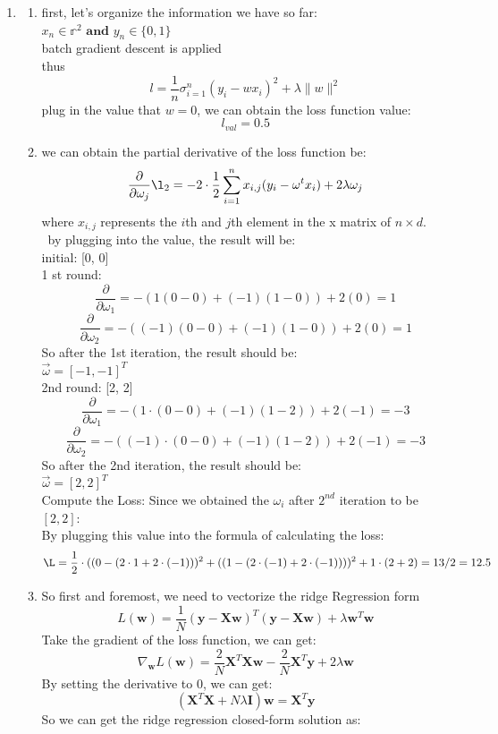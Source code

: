 \documentclass[12pt]{article}
\begin{document}
\begin{enumerate}
\begin{enumerate}
  \end{enumerate}

\item
  \begin{enumerate}
  \item first, let's organize the information we have so far:\\
    \(x_n \in \mathbb{r}^2 \textbf{ and } y_n \in \{ 0, 1\}\) \\
    batch gradient descent is applied\\
    thus
    \[
    l=\frac{1}{n} \sigma_{i=1}^n\left(y_i-w x_i\right)^2+\lambda\|w\|^2
    \]
    plug in the value that \(w = 0\), we can obtain the loss function value:
    \[
    l_{val} = 0.5
    \]
    
  \item 
  we can obtain the partial derivative of the loss function be:
  \[
  \frac{\partial}{\partial \omega_j}\l_{2} = -2 \cdot \frac{1}{2} \sum_{i = 1}^{n} x_{i,j}(y_i - \omega^t x_i) + 2 \lambda \omega_{j}
  \]
  where \(x_{i,j}\) represents the \(i\)th and \(j\)th element in the x matrix of \(n \times d\). \
  by plugging into the value, the result will be:\\
  initial: [0, 0]\\
  
  1 st round:
  \[
  \frac{\partial}{\partial \omega_1} = -(1(0-0) + (-1)(1-0)) + 2(0) = 1
  \]
  \[
  \frac{\partial}{\partial \omega_2} = -((-1)(0 - 0) + (-1)(1-0)) + 2(0) = 1
  \]
  So after the 1st iteration, the result should be:\\
  \(\vec{\omega} = [-1, -1]^T\) \\
  2nd round: [2, 2]
  \[
  \frac{\partial}{\partial \omega_1} = -(1 \cdot (0-0) + (-1)(1 -2)) + 2(-1) = -3 
  \] 
  \[
  \frac{\partial}{\partial \omega_2} = -((-1)\cdot (0-0) + (-1)(1 -2)) + 2(-1) = -3
  \]
  So after the 2nd iteration, the result should be:\\
  \(\vec{\omega} = [2, 2]^T\) \\
  Compute the Loss:
  Since we obtained the \(\omega_{i}\) after \(2^{nd}\) iteration to be \([2, 2]\):\\
  By plugging this value into the formula of calculating the loss:\\
  \[
  \L = \frac{1}{2} \cdot ((0 - (2 \cdot 1 +  2 \cdot (-1)))^2 + ((1 - (2 \cdot (-1) + 2 \cdot (-1))))^2 + 1 \cdot (2 + 2) = 13 / 2 = 12.5
  \]
  
  
  \item So first  and foremost, we need to vectorize the ridge Regression form
  \[
  L(\mathbf{w})=\frac{1}{N}(\mathbf{y}-\mathbf{X} \mathbf{w})^T(\mathbf{y}-\mathbf{X} \mathbf{w})+\lambda \mathbf{w}^T \mathbf{w}
  \]
  Take the gradient of the loss function, we can get:
  \[
  \nabla_{\mathbf{w}} L(\mathbf{w})=\frac{2}{N} \mathbf{X}^T \mathbf{X} \mathbf{w}-\frac{2}{N} \mathbf{X}^T \mathbf{y}+2 \lambda \mathbf{w}
  \]
  By setting the derivative to \(0\), we can get:
  \[
  \left(\mathbf{X}^T \mathbf{X}+N \lambda \mathbf{I}\right) \mathbf{w}=\mathbf{X}^T \mathbf{y}
  \]
  So we can get the ridge regression closed-form solution as:
  

\end{enumerate}
\end{enumerate}
\end{document}
